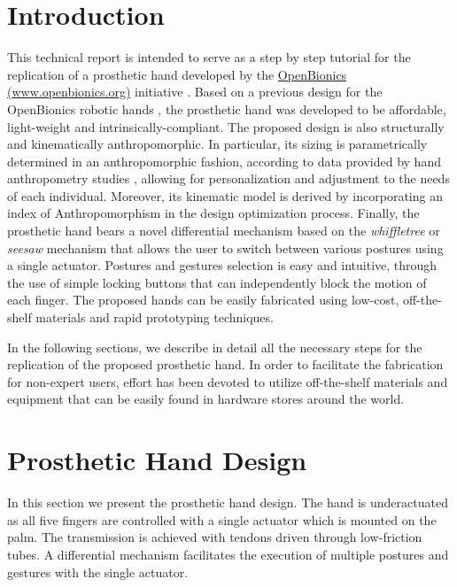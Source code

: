 \section{Introduction}


\indent This technical report is intended to serve as a step by step tutorial for the replication of a prosthetic hand \cite{Kontoudis2015IROS} developed by the \href{www.openbionics.org}{OpenBionics (www.openbionics.org)} initiative \cite{Liarokapis2014ASURRW}. Based on a previous design for the OpenBionics robotic hands \cite{Zisimatos2014IROS}, the prosthetic hand was developed to be affordable, light-weight and intrinsically-compliant. The proposed design is also structurally and kinematically anthropomorphic. In particular, its sizing is parametrically determined in an anthropomorphic fashion, according to data provided by hand anthropometry studies \cite{BuchholzErgonomics1992}, allowing for personalization and adjustment to the needs of each individual. Moreover, its kinematic model is derived by incorporating an index of Anthropomorphism \cite{Liarokapis2013ICRA} in the design optimization process. Finally, the prosthetic hand bears a novel differential mechanism based on the \textit{whiffletree} or \textit{seesaw} mechanism that allows the user to switch between various postures using a single actuator. Postures and gestures selection is easy and intuitive, through the use of simple locking buttons that can independently block the motion of each finger. The proposed hands can be easily fabricated using low-cost, off-the-shelf materials and rapid prototyping techniques. 

 
In the following sections, we describe in detail all the necessary steps for the replication of the proposed prosthetic hand. In order to facilitate the fabrication for non-expert users, effort has been devoted to utilize off-the-shelf materials and equipment that can be easily found in hardware stores around the world.

\section{Prosthetic Hand Design}

In this section we present the prosthetic hand design. The hand is underactuated as all five fingers are controlled with a single actuator which is mounted on the palm. The transmission is achieved with tendons driven through low-friction tubes. A differential mechanism facilitates the execution of multiple postures and gestures with the single actuator. 

